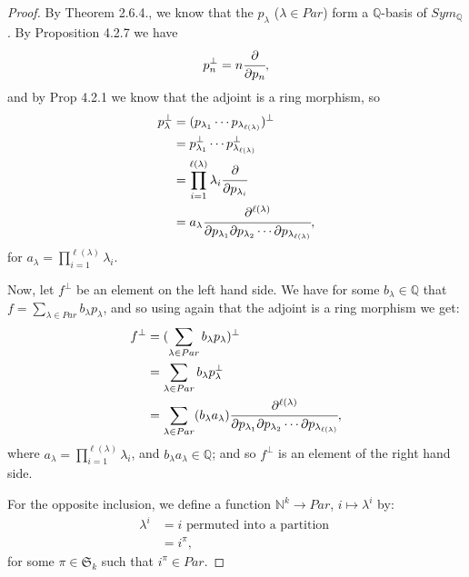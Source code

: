 \documentclass[8pt]{extarticle}
\newcommand{\N}{\mathbb{N}}
\newcommand{\Q}{\mathbb{Q}}
\newcommand{\<}{\langle}
\renewcommand{\>}{\rangle}
\theoremstyle{definition}
\begin{document}
\begin{proof}
  By Theorem 2.6.4., we know that the $p_\lambda$ ($\lambda \in Par$) form a $\Q$-basis of $Sym_\Q$. By Proposition 4.2.7 we have
  \begin{align*}
    p_n^{\perp} = n \cfrac{\partial}{\partial p_n},
  \end{align*}
  and by Prop 4.2.1 we know that the adjoint is a ring morphism, so
  \begin{align*}
    p_{\lambda}^{\perp} &=
    (p_{\lambda_1} \cdots p_{\lambda_{\ell(\lambda)}})^{\perp} \\
    &= p_{\lambda_1}^{\perp} \cdots p_{\lambda_{\ell(\lambda)}}^{\perp} \\
    &= \prod_{i=1}^{\ell(\lambda)} \lambda_i \cfrac{\partial}{\partial p_{\lambda_i}} \\
    &= a_{\lambda} \cfrac{\partial^{\ell(\lambda)}}{\partial p_{\lambda_1}\partial p_{\lambda_2} \cdots \partial p_{\lambda_{\ell(\lambda)}}},
  \end{align*}
  for $a_{\lambda} = \prod\limits_{i=1}^{\ell(\lambda)} \lambda_i$.

  Now, let $f^{\perp}$ be an element on the left hand side. We have for some $b_\lambda \in \Q$ that $f = \sum\limits_{\lambda \in Par} b_{\lambda} p_{\lambda}$, and so using again that the adjoint is a ring morphism we get:
  \begin{align*}
    f^{\perp}
    &=
    (\sum\limits_{\lambda \in Par} b_{\lambda} p_{\lambda})^{\perp}
    \\
    &=
    \sum\limits_{\lambda \in Par} b_{\lambda} p_{\lambda}^{\perp}    \\
    &=
    \sum\limits_{\lambda \in Par} (b_{\lambda} a_{\lambda}) \cfrac{\partial^{\ell(\lambda)}}{\partial p_{\lambda_1}\partial p_{\lambda_2} \cdots \partial p_{\lambda_{\ell(\lambda)}}}, 
  \end{align*}
  where $a_{\lambda} = \prod\limits_{i=1}^{\ell(\lambda)} \lambda_i$, and $b_{\lambda} a_{\lambda} \in \Q$; and so $f^{\perp}$ is an element of the right hand side.

  For the opposite inclusion, we define a function $\N^k \to Par$,  $i \mapsto \lambda^i$ by:
  \begin{align*}
    \lambda^i
    &= i \text{ permuted into a partition } \\
    &= i^{\pi},
  \end{align*}
  for some $\pi \in \mathfrak{S}_k$ such that $i^{\pi} \in Par$. 


\end{proof}
\end{document}

